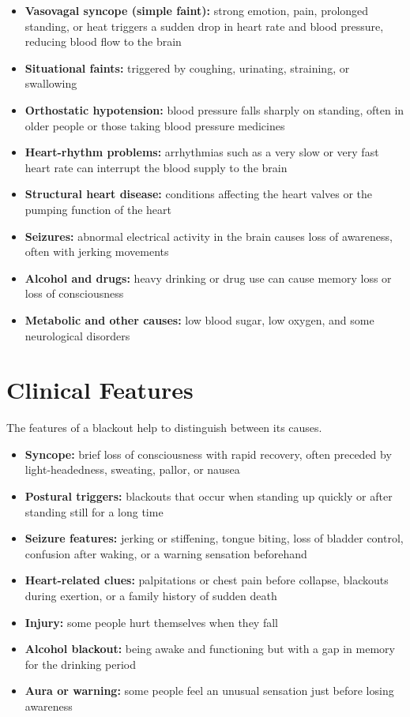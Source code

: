 \begin{itemize}
    \item \textbf{Vasovagal syncope (simple faint):} strong emotion, pain, prolonged standing, or heat triggers a sudden drop in heart rate and blood pressure, reducing blood flow to the brain
    \item \textbf{Situational faints:} triggered by coughing, urinating, straining, or swallowing
    \item \textbf{Orthostatic hypotension:} blood pressure falls sharply on standing, often in older people or those taking blood pressure medicines
    \item \textbf{Heart-rhythm problems:} arrhythmias such as a very slow or very fast heart rate can interrupt the blood supply to the brain
    \item \textbf{Structural heart disease:} conditions affecting the heart valves or the pumping function of the heart
    \item \textbf{Seizures:} abnormal electrical activity in the brain causes loss of awareness, often with jerking movements
    \item \textbf{Alcohol and drugs:} heavy drinking or drug use can cause memory loss or loss of consciousness
    \item \textbf{Metabolic and other causes:} low blood sugar, low oxygen, and some neurological disorders
\end{itemize}

\section*{Clinical Features}
The features of a blackout help to distinguish between its causes.

\begin{itemize}
    \item \textbf{Syncope:} brief loss of consciousness with rapid recovery, often preceded by light-headedness, sweating, pallor, or nausea
    \item \textbf{Postural triggers:} blackouts that occur when standing up quickly or after standing still for a long time
    \item \textbf{Seizure features:} jerking or stiffening, tongue biting, loss of bladder control, confusion after waking, or a warning sensation beforehand
    \item \textbf{Heart-related clues:} palpitations or chest pain before collapse, blackouts during exertion, or a family history of sudden death
    \item \textbf{Injury:} some people hurt themselves when they fall
    \item \textbf{Alcohol blackout:} being awake and functioning but with a gap in memory for the drinking period
    \item \textbf{Aura or warning:} some people feel an unusual sensation just before losing awareness
\end{itemize}

